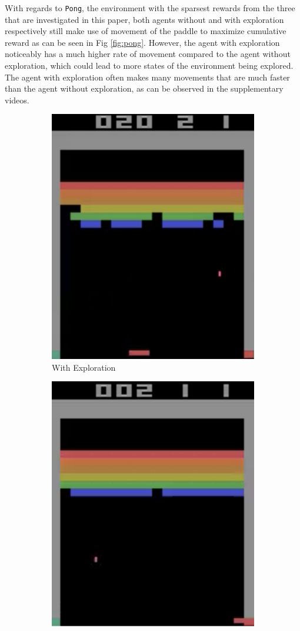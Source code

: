 \documentclass{article}
\begin{document}
With regards to \texttt{Pong}, the environment with the sparsest rewards from the three that are investigated in this paper, both agents without and with exploration respectively still make use of movement of the paddle to maximize cumulative reward as can be seen in Fig \ref{fig:pong}. However, the agent with exploration noticeably has a much higher rate of movement compared to the agent without exploration, which could lead to more states of the environment being explored. The agent with exploration often makes many movements that are much faster than the agent without exploration, as can be observed in the supplementary videos.

\begin{figure}
\centering
\begin{subfigure}{.5\textwidth}
  \centering
  \includegraphics[width=.7\linewidth]{figures/breakout}
  \caption{With Exploration}
\end{subfigure}%
\begin{subfigure}{.5\textwidth}
  \centering
  \includegraphics[width=.7\linewidth]{figures/breakout_no_exp}

\end{subfigure}
\end{figure}
\end{document}
